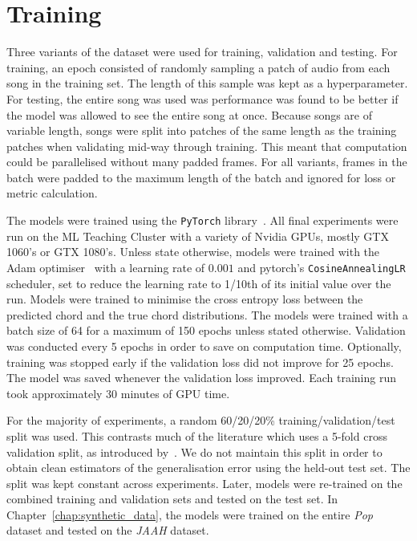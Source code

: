 \section{Training}

Three variants of the dataset were used for training, validation and testing. For training, an epoch consisted of randomly sampling a patch of audio from each song in the training set. The length of this sample was kept as a hyperparameter. For testing, the entire song was used was performance was found to be better if the model was allowed to see the entire song at once. Because songs are of variable length, songs were split into patches of the same length as the training patches when validating mid-way through training. This meant that computation could be parallelised without many padded frames. For all variants, frames in the batch were padded to the maximum length of the batch and ignored for loss or metric calculation.

The models were trained using the \texttt{PyTorch} library~\citep{pytorch}. All final experiments were run on the ML Teaching Cluster with a variety of Nvidia GPUs, mostly GTX 1060's or GTX 1080's. Unless state otherwise, models were trained with the Adam optimiser~\citep{adam} with a learning rate of $0.001$ and pytorch's \texttt{CosineAnnealingLR} scheduler, set to reduce the learning rate to 1/10th of its initial value over the run. Models were trained to minimise the cross entropy loss between the predicted chord and the true chord distributions. The models were trained with a batch size of 64 for a maximum of 150 epochs unless stated otherwise. Validation was conducted every 5 epochs in order to save on computation time. Optionally, training was stopped early if the validation loss did not improve for 25 epochs. The model was saved whenever the validation loss improved. Each training run took approximately 30 minutes of GPU time. 

For the majority of experiments, a random 60/20/20\% training/validation/test split was used. This contrasts much of the literature which uses a 5-fold cross validation split, as introduced by~\citet{FourTimelyInsights}. We do not maintain this split in order to obtain clean estimators of the generalisation error using the held-out test set. The split was kept constant across experiments. Later, models were re-trained on the combined training and validation sets and tested on the test set. In Chapter~\ref{chap:synthetic_data}, the models were trained on the entire \emph{Pop} dataset and tested on the \emph{JAAH} dataset.